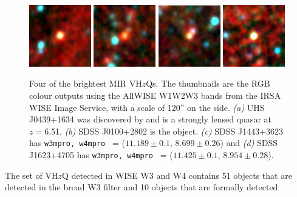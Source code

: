 \documentclass[usenatbib]{mnras}
\begin{document}
\begin{figure}
    \centering
    \includegraphics[width=0.24\textwidth]{../data/WISE/image_thumbnails/UHS_J0439+1634.png} 
    \includegraphics[width=0.24\textwidth]{../data/WISE/image_thumbnails/SDSS_J1443+3623.png}
    \includegraphics[width=0.24\textwidth]{../data/WISE/image_thumbnails/SDSS_J1623+4705.png}
    \includegraphics[width=0.24\textwidth]{../data/WISE/image_thumbnails/SDSS_J0100+2802.png}
    \caption{Four of the brightest MIR VH$z$Qs. 
      The thumbnails are the RGB colour outputs using the AllWISE W1W2W3 bands from the 
      IRSA WISE Image Service, with a scale of 120'' on the side. 
      {\it (a)} UHS J0439+1634 was discovered by
      \citet{Fan2019} and is a strongly lensed quasar at $z=$6.51. 
      {\it (b)} SDSS J0100+2802 is the \citet{Wu2015} object. 
      {\it (c)} SDSS J1443+3623 has {\tt w3mpro, w4mpro } = ($11.189\pm0.1$, $8.699\pm0.26$) and 
      {\it (d)} SDSS J1623+4705 has {\tt w3mpro, w4mpro } = ($11.425\pm0.1$, $8.954\pm0.28$).}
    \label{fig:VHzQ_W4s}
\end{figure}
The set of VH$z$Q detected in WISE W3 and W4 contains 51 objects that are
detected in the broad W3 filter and 10 objects that are formally detected
\end{document}
